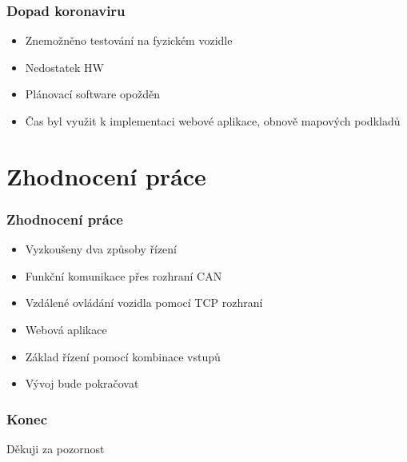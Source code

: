 \documentclass{beamer}
\begin{document}
\begin{frame}
    \frametitle{Dopad koronaviru}
    \begin{itemize}
        \item Znemožněno testování na fyzickém vozidle
        \item Nedostatek HW
        \item Plánovací software opožděn
        \item Čas byl využit k implementaci webové aplikace, obnově mapových podkladů
    \end{itemize}
\end{frame}

\section{Zhodnocení práce}

\begin{frame}
    \frametitle{Zhodnocení práce}
    \begin{itemize}
        \item Vyzkoušeny dva způsoby řízení
        \item Funkční komunikace přes rozhraní CAN
        \item Vzdálené ovládání vozidla pomocí TCP rozhraní
        \item Webová aplikace
        \item Základ řízení pomocí kombinace vstupů
        \item Vývoj bude pokračovat
    \end{itemize}
\end{frame}

\begin{frame}
    \frametitle{Konec}
    \begin{center}
        Děkuji za pozornost
    \end{center}
\end{frame}
\end{document}
